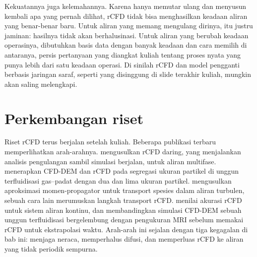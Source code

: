 Kekuatannya juga kelemahannya. Karena hanya memutar ulang dan menyusun kembali apa yang pernah dilihat,
rCFD tidak bisa menghasilkan keadaan aliran yang benar-benar baru. Untuk aliran yang memang mengulang
dirinya, itu justru jaminan: hasilnya tidak akan berhalusinasi. Untuk aliran yang berubah keadaan
operasinya, dibutuhkan basis data dengan banyak keadaan dan cara memilih di antaranya, persis pertanyaan
yang diangkat kuliah tentang proses nyata yang punya lebih dari satu keadaan operasi. Di sinilah rCFD dan model pengganti berbasis jaringan saraf,
seperti yang disinggung di slide terakhir kuliah, mungkin akan saling melengkapi.

\section{Perkembangan riset}

Riset rCFD terus berjalan setelah kuliah. Beberapa publikasi terbaru memperlihatkan arah-arahnya. \citet{hoorijani2024}
mengusulkan rCFD daring, yang menjalankan analisis pengulangan sambil simulasi berjalan, untuk aliran multifase.
\citet{pirker2025seg} menerapkan CFD-DEM dan rCFD pada segregasi ukuran partikel di unggun terfluidisasi gas--padat dengan
dua dan lima ukuran partikel. \citet{lumetzberger2025} mengusulkan aproksimasi momen-propagator untuk transport spesies dalam
aliran turbulen, sebuah cara lain merumuskan langkah transport rCFD. \citet{shariatifar2026} menilai akurasi rCFD untuk
sistem aliran kontinu, dan \citet{shaik2026} membandingkan simulasi CFD-DEM sebuah unggun terfluidisasi bergelembung dengan
pengukuran MRI sebelum memakai rCFD untuk ekstrapolasi waktu. Arah-arah ini sejalan dengan tiga kegagalan di bab ini:
menjaga neraca, memperhalus difusi, dan memperluas rCFD ke aliran yang tidak periodik sempurna.

